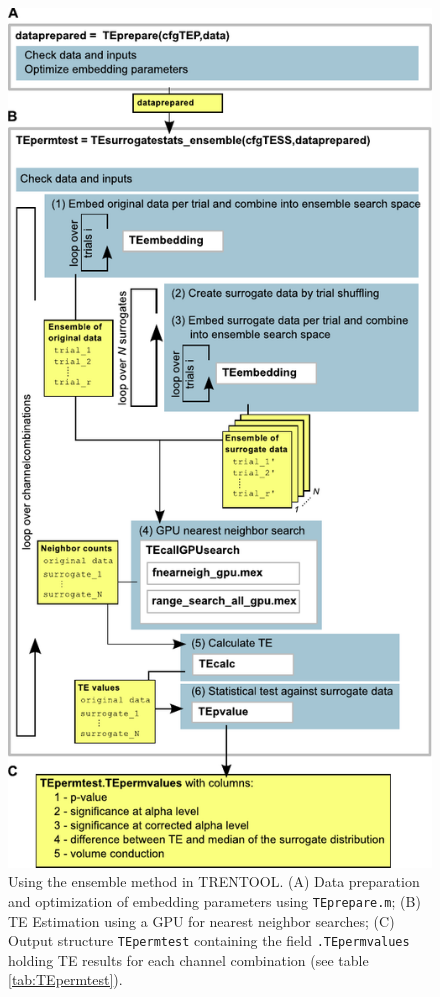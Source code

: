 \documentclass[a4paper,10pt]{article}
\begin{document}
\begin{figure}[H]	
	\centering 
 		\includegraphics[scale=0.70]{figures/TRENTOOL3_workflow_ensemble.pdf}
	\caption[TRENTOOL Work flow ensemble method on GPU]{Using the ensemble method in TRENTOOL. 
	(A) Data preparation and optimization of embedding parameters using \texttt{TEprepare.m};
	(B) TE Estimation using a GPU for nearest neighbor searches;
	(C) Output structure \texttt{TEpermtest} containing the field \texttt{.TEpermvalues} holding TE results for each channel combination (see table \ref{tab:TEpermtest}).
	}
	\label{fig:workflow_ensemble}
\end{figure}
\end{document}
